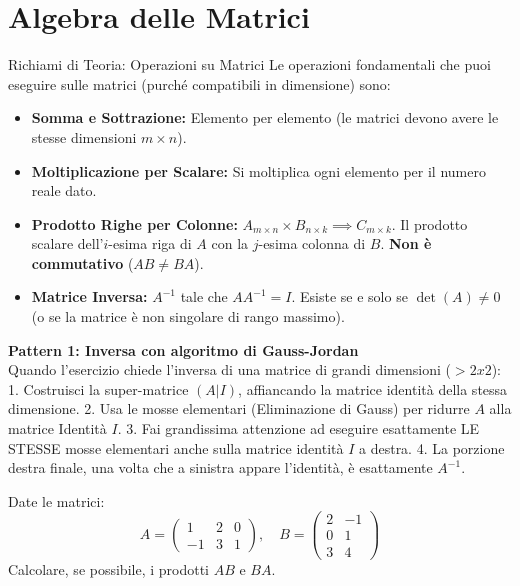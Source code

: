 \section{Algebra delle Matrici}

\begin{concept}{Richiami di Teoria: Operazioni su Matrici}
Le operazioni fondamentali che puoi eseguire sulle matrici (purché compatibili in dimensione) sono:
\begin{itemize}
    \item \textbf{Somma e Sottrazione:} Elemento per elemento (le matrici devono avere le stesse dimensioni $m \times n$).
    \item \textbf{Moltiplicazione per Scalare:} Si moltiplica ogni elemento per il numero reale dato.
    \item \textbf{Prodotto Righe per Colonne:} $A_{m \times n} \times B_{n \times k} \implies C_{m \times k}$. Il prodotto scalare dell'$i$-esima riga di $A$ con la $j$-esima colonna di $B$. \textbf{Non è commutativo} ($AB \neq BA$).
    \item \textbf{Matrice Inversa:} $A^{-1}$ tale che $AA^{-1} = I$. Esiste se e solo se $\det(A) \neq 0$ (o se la matrice è non singolare di rango massimo).
\end{itemize}
\end{concept}

\begin{logicbox}
\textbf{Pattern 1: Inversa con algoritmo di Gauss-Jordan}\\
Quando l'esercizio chiede l'inversa di una matrice di grandi dimensioni ($>2x2$):
1. Costruisci la super-matrice $(A|I)$, affiancando la matrice identità della stessa dimensione.
2. Usa le mosse elementari (Eliminazione di Gauss) per ridurre $A$ alla matrice Identità $I$.
3. Fai grandissima attenzione ad eseguire esattamente LE STESSE mosse elementari anche sulla matrice identità $I$ a destra.
4. La porzione destra finale, una volta che a sinistra appare l'identità, è esattamente $A^{-1}$.
\end{logicbox}

\begin{exercisebox}[title={Esercizio 1: Prodotto Righe per Colonne}]
Date le matrici:
$$ A = \begin{pmatrix} 1 & 2 & 0 \\ -1 & 3 & 1 \end{pmatrix}, \quad B = \begin{pmatrix} 2 & -1 \\ 0 & 1 \\ 3 & 4 \end{pmatrix} $$
Calcolare, se possibile, i prodotti $AB$ e $BA$.
\end{exercisebox}

